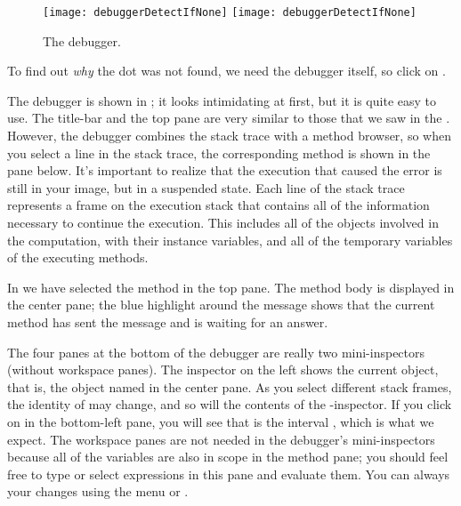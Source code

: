 \documentclass[a4paper,10pt,twoside]{book}
\begin{document}
\begin{figure}[btp]
	\begin{center}
	\ifluluelse
		{\texttt{[image: debuggerDetectIfNone]}}
		{\texttt{[image: debuggerDetectIfNone]}}
	\end{center}
	\caption{The debugger.}
\end{figure}

To find out \emph{why} the dot was not found, we need the debugger itself, so click on .


The debugger is shown in ; it looks intimidating at first, but it is quite easy to use.
The title-bar and the top pane are very similar to those that we saw in the .  
However, the debugger combines the stack trace with a method browser, so when you select a line in the stack trace, the corresponding method is shown in the pane below.
It's important to realize that the execution that caused the error is still in your image, but in a suspended state.  
Each line of the stack trace represents a frame on the execution stack that contains all of the information necessary to continue the execution.  This includes all of the objects involved in the computation, with their instance variables, and all of the temporary variables of the executing methods.

In  we have selected the  method in the top pane.
The method body is displayed in the center pane; the blue highlight around the message  shows that the current method has sent the message  and is waiting for an answer.

The four panes at the bottom of the debugger are really two mini-inspectors (without workspace panes).
The inspector on the left shows the current object, that is, the object named \self in the center pane.
As you select different stack frames, the identity of \self may change, and so will the contents of the 
\self{}-inspector.
If you click on \self in the bottom-left pane, you will see that \self is the interval , which is what we expect.
The workspace panes are not needed in the debugger's mini-inspectors because all of the variables are also in scope in the method pane; you should feel free to type or select expressions in this pane and evaluate them.  
You can always  your changes using the menu or . 
\end{document}
